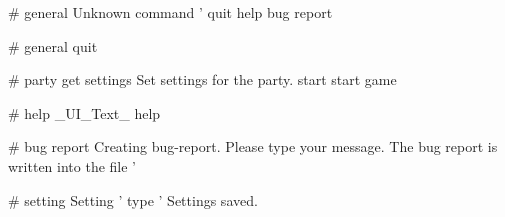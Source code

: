 # general
Unknown command '%
quit
help
bug report

# general
quit

# party get settings
Set settings for the party.
start
start game

# help
_UI_Text_ help

# bug report
Creating bug-report.
Please type your message.
The bug report is written into the file '%

# setting
Setting '%
type '%
Settings saved.
